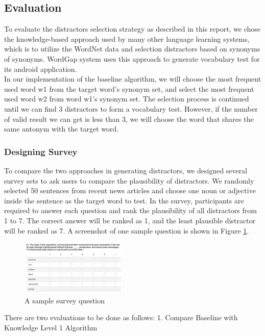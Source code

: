 \subsection{Evaluation}
To evaluate the distractors selection strategy as described in this report, we chose the knowledge-based approach used by many other language learning systems, which is to utilize the WordNet data and selection distractors based on synonyms of synonyms. WordGap system uses this approach to generate vocabulary test for its android application.
\\
In our implementation of the baseline algorithm, we will choose the most frequent used word w1 from the target word’s synonym set, and select the most frequent used word w2 from word w1’s synonym set. The selection process is continued until we can find 3 distractors to form a vocabulary test. However, if the number of valid result we can get is less than 3, we will choose the word that shares the same antonym with the target word.
\\
\subsubsection{Designing Survey}
To compare the two approaches in generating distractors, we designed several survey sets to ask users to compare the plausibility of distractors. We randomly selected 50 sentences from recent news articles and choose one noun or adjective inside the sentence as the target word to test. In the survey, participants are required to answer each question and rank the plausibility of all distractors from 1 to 7. The correct answer will be ranked as 1, and the least plausible distractor will be ranked as 7. A screenshot of one sample question is shown in Figure \ref{fig:distractor_1}.
\\
\begin{figure}[ht]
   \centering
   \includegraphics[width=0.45\textwidth]{distractor_1.jpg}
   \caption{A sample survey question}
   \label{fig:distractor_1}
\end{figure}
There are two evaluations to be done as follows:
1.  Compare Baseline with Knowledge Level 1 Algorithm

